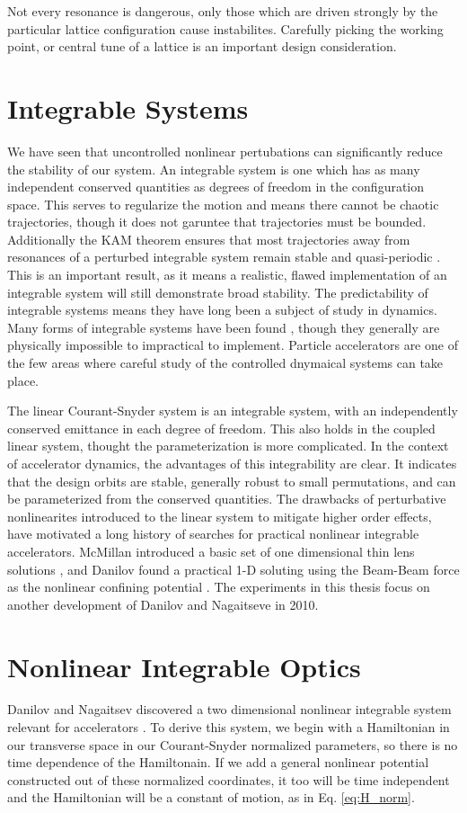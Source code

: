 Not every resonance is dangerous, only those which are driven strongly by the particular lattice configuration cause instabilites. Carefully picking the working point, or central tune of a lattice is an important design consideration.

\section{Integrable Systems} \label{sec:integral}
We have seen that uncontrolled nonlinear pertubations can significantly reduce the stability of our system. An integrable system is one which has as many independent conserved quantities as degrees of freedom in the configuration space. This serves to regularize the motion and means there cannot be chaotic trajectories, though it does not garuntee that trajectories must be bounded. Additionally the KAM theorem ensures that most trajectories away from resonances of a perturbed integrable system remain stable and quasi-periodic \cite{Moser}. This is an important result, as it means a realistic, flawed implementation of an integrable system will still demonstrate broad stability. The predictability of integrable systems means they have long been a subject of study in dynamics. Many forms of integrable systems have been found \cite{Heiterinta}, though they generally are physically impossible to impractical to implement. Particle accelerators are one of the few areas where careful study of the controlled dnymaical systems can take place.

The linear Courant-Snyder system is an integrable system, with an independently conserved emittance in each degree of freedom. This also holds in the coupled linear system, thought the parameterization is more complicated. In the context of accelerator dynamics, the advantages of this integrability are clear. It indicates that the design orbits are stable, generally robust to small permutations, and can be parameterized from the conserved quantities. The drawbacks of perturbative nonlinearites introduced to the linear system to mitigate higher order effects, have motivated a long history of searches for practical nonlinear integrable accelerators. McMillan introduced a basic set of one dimensional thin lens solutions \cite{McMillan}, and Danilov found a practical 1-D soluting using the Beam-Beam force as the nonlinear confining potential \cite{Danilov1D}. The experiments in this thesis focus on another development of Danilov and Nagaitseve in 2010.

\section{Nonlinear Integrable Optics} \label{sec:nio}
Danilov and Nagaitsev discovered a two dimensional nonlinear integrable system relevant for accelerators \cite{danilov_nonlinear_2010}. To derive this system, we begin with a Hamiltonian in our transverse space in our Courant-Snyder normalized parameters, so there is no time dependence of the Hamiltonain.  If we add a general nonlinear potential constructed out of these normalized coordinates, it too will be time independent and the Hamiltonian will be a constant of motion, as in Eq. \ref{eq:H_norm}.

